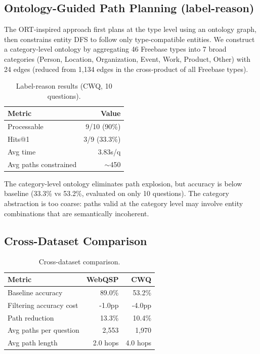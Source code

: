 \documentclass[11pt,twoside]{article}
\begin{document}
\subsection{Ontology-Guided Path Planning (label-reason)}

The ORT-inspired approach first plans at the type level using an ontology graph,
then constrains entity DFS to follow only type-compatible entities. We construct
a category-level ontology by aggregating 46 Freebase types into 7 broad
categories (Person, Location, Organization, Event, Work, Product, Other) with
24 edges (reduced from 1,134 edges in the cross-product of all Freebase types).

\begin{table}[H]
  \centering
  \caption{Label-reason results (CWQ, 10 questions).}
  \label{tab:label-reason}
  \begin{tabular}{lr}
    \toprule
    \textbf{Metric} & \textbf{Value} \\
    \midrule
    Processable & 9/10 (90\%) \\
    Hits@1 & 3/9 (33.3\%) \\
    Avg time & 3.83s/q \\
    Avg paths constrained & \(\sim\)450 \\
    \bottomrule
  \end{tabular}
\end{table}

The category-level ontology eliminates path explosion, but accuracy is below
baseline (33.3\% vs 53.2\%, evaluated on only 10 questions). The category
abstraction is too coarse: paths valid at the category level may involve entity
combinations that are semantically incoherent.

\subsection{Cross-Dataset Comparison}

\begin{table}[H]
  \centering
  \caption{Cross-dataset comparison.}
  \label{tab:cross}
  \begin{tabular}{lrr}
    \toprule
    \textbf{Metric} & \textbf{WebQSP} & \textbf{CWQ} \\
    \midrule
    Baseline accuracy & 89.0\% & 53.2\% \\
    Filtering accuracy cost & -1.0pp & -4.0pp \\
    Path reduction & 13.3\% & 10.4\% \\
    Avg paths per question & 2,553 & 1,970 \\
    Avg path length & 2.0 hops & 4.0 hops \\
    \bottomrule
  \end{tabular}
\end{table}
\end{document}
